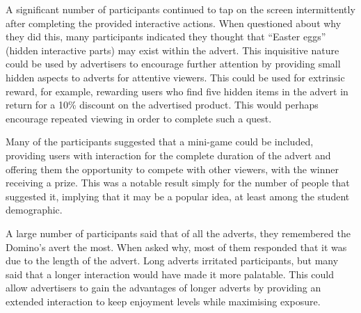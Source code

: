 	A significant number of participants continued to tap on the screen intermittently after completing the provided interactive actions. When questioned about why they did this, many participants indicated they thought that ``Easter eggs'' (hidden interactive parts) may exist within the advert. This inquisitive nature could be used by advertisers to encourage further attention by providing small hidden aspects to adverts for attentive viewers. This could be used for extrinsic reward, for example, rewarding users who find five hidden items in the advert in return for a 10\% discount on the advertised product. This would perhaps encourage repeated viewing in order to complete such a quest.

	Many of the participants suggested that a mini-game could be included, providing users with interaction for the complete duration of the advert and offering them the opportunity to compete with other viewers, with the winner receiving a prize. This was a notable result simply for the number of people that suggested it, implying that it may be a popular idea, at least among the student demographic.

	A large number of participants said that of all the adverts, they remembered the Domino's avert the most. When asked why, most of them responded that it was due to the length of the advert. Long adverts irritated participants, but many said that a longer interaction would have made it more palatable. This could allow advertisers to gain the advantages of longer adverts by providing an extended interaction to keep enjoyment levels while maximising exposure.
